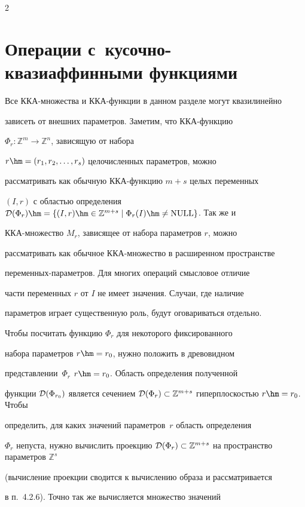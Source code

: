 \begin{multicols}{2}
\section{Операции с~кусочно-квазиаффинными функциями}



Все ККА-множества и ККА-функции в данном разделе могут квазилинейно

зависеть от внешних параметров. Заметим, что ККА-функцию

$\Phi_r:\mathbb{Z}^m\to\mathbb{Z}^n$, зависящую от набора

$r\hm=(r_1,r_2,\ldots,r_s)$ целочисленных параметров, можно

рассматривать как обычную ККА-функ\-цию $m+s$ целых переменных

$(I,r)$ с областью определения ${\cal D}(\Phi_r)\hm=\{ (I,r)\hm\in

\mathbb{Z}^{m+s} \mid \Phi_r(I)\hm\neq \mathrm{NULL} \}$. Так же и

ККА-множество $M_r$, зависящее от набора параметров $r$, можно

рассматривать как обычное ККА-мно\-же\-ст\-во в расширенном пространстве

пе\-ре\-мен\-ных-па\-ра\-мет\-ров. Для многих операций смысловое отличие

части переменных $r$ от $I$ не имеет значения. Случаи, где наличие

параметров играет существенную роль, будут оговариваться отдельно.



Чтобы посчитать функцию $\Phi_r$ для некоторого фиксированного

набора параметров $r\hm=r_0$, нужно положить в древовидном

представлении~$\Phi_r$ $r\hm=r_0$. Область определения полученной

функции ${\cal D}(\Phi_{r_0})$ является сечением ${\cal

D}(\Phi_r)\subset \mathbb{Z}^{m+s}$ гиперплоскостью $r\hm=r_0$. Чтобы

определить, для каких значений параметров~$r$ область определения

$\Phi_r$ непуста, нужно вычислить проекцию ${\cal D}(\Phi_r)\subset

\mathbb{Z}^{m+s}$ на пространство параметров $\mathbb{Z}^s$

(вычисление проекции сводится к вычислению образа и рассматривается

в п.~4.2.6). Точно так же вычисляется множество значений


\end{multicols}
